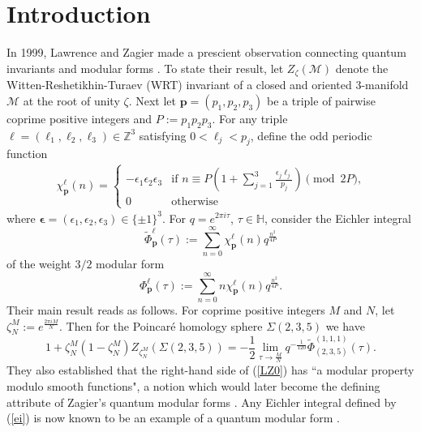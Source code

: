\documentclass[11pt,reqno]{amsart}
\theoremstyle{definition}
\numberwithin{equation}{section}
\renewcommand{\=}{\;=\;}
\begin{document}
\section{Introduction}
In 1999, Lawrence and Zagier made a prescient observation connecting quantum invariants and modular forms \cite{lz}.   To state their result, let $Z_{\zeta}(\mathcal{M})$ denote the Witten-Reshetikhin-Turaev (WRT) invariant of a closed and oriented 3-manifold $\mathcal{M}$ at the root of unity $\zeta$. Next let $\bm{p} = (p_1, p_2, p_3)$ be a triple of pairwise coprime positive integers and $P:=p_1 p_2 p_3$. For any triple $\bm{\ell} = (\ell_1, \ell_2, \ell_3) \in \mathbb{Z}^3$ satisfying $0 < \ell_j < p_j$, define the odd periodic function 
\begin{eqnarray*}
\chi_{\bm{p}}^{\bm{\ell}}(n) = 
\begin{cases}
-\epsilon_1 \epsilon_2 \epsilon_3 & \text{if $n \equiv P \left( 1 + \displaystyle \sum_{j=1}^{3} \frac{\epsilon_j \ell_j}{p_j} \right) \pmod{2P}$,} \\
0 & \text{otherwise}
\end{cases}
\end{eqnarray*}
where $\bm{\epsilon} = (\epsilon_1, \epsilon_2, \epsilon_3) \in \{ \pm 1 \}^3$. For $q=e^{2 \pi i \tau}$, $\tau \in \mathbb{H}$, consider the Eichler integral
\begin{equation} \label{ei}
\widetilde{\Phi}_{\bm{p}}^{\bm{\ell}}(\tau) := \sum_{n=0}^{\infty} \chi_{\bm{p}}^{\bm{\ell}}(n) q^{\frac{n^2}{4P}}
\end{equation}
of the weight $3/2$ modular form
\begin{equation*}
\Phi_{\bm{p}}^{\bm{\ell}}(\tau) := \sum_{n=0}^{\infty} n \chi_{\bm{p}}^{\bm{\ell}}(n) q^{\frac{n^2}{4P}}.
\end{equation*} 
Their main result \cite[Theorem 1]{lz} reads as follows.   For coprime positive integers $M$ and $N$, let $\zeta_N^M := e^{\frac{2 \pi i M}{N}}$.   Then for the Poincar\'e homology sphere $\Sigma(2,3,5)$ we have   
\begin{equation} \label{LZ0}
1 + \zeta_N^M(1-\zeta_N^M) Z_{\zeta_N^M}(\Sigma(2,3,5)) =  -\frac{1}{2} \lim_{\tau \to \frac{M}{N}} q^{-\frac{1}{120}} \widetilde{\Phi}_{(2,3,5)}^{(1,1,1)} (\tau).
\end{equation}
They also established that the right-hand side of (\ref{LZ0}) has ``a modular property modulo smooth functions", a notion which would later become the defining attribute of Zagier's quantum modular forms \cite{zquantum}.  Any Eichler integral defined by (\ref{ei}) is now known to be an example of a quantum modular form \cite[Section 4.4]{go}. 
\end{document}
